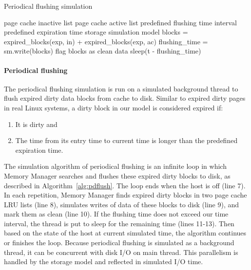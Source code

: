 \documentclass[conference]{IEEEtran}
\newcommand{\Desc}[2]{\State \makebox[2em][l]{#1}#2}
\begin{document}
			\begin{algorithm}\caption{Periodical flushing simulation}\label{alg:pdflush}
				\small
				\begin{algorithmic}[1]
					\Input
        				\Desc{in}{page cache inactive list}
        				\Desc{ac}{page cache active list}
						\Desc{t}{predefined flushing time interval}
						\Desc{exp}{predefined expiration time}						
						\Desc{sm}{storage simulation model}
   					\EndInput
						\State blocks = expired\_blocks(exp, in) + expired\_blocks(exp, ac) 
						\State flushing\_time = sm.write(blocks)
						\State flag blocks as clean data
							\State sleep(t - flushing\_time)
						\EndIf
					\EndWhile
				\end{algorithmic}
			\end{algorithm}				

			\paragraph*{Periodical flushing}	
			The periodical flushing simulation is run on a simulated background thread 
			to flush expired dirty data blocks from cache to disk.
			Similar to expired dirty pages in real Linux systems, a dirty block in our model 
			is considered expired if: 
			\begin{enumerate}
				\item It is dirty and 
				\item The time from its entry time to current time is longer than the 
				predefined expiration time. 
			\end{enumerate}
			The simulation algorithm of periodical flushing is an infinite loop in which 
			Memory Manager searches and flushes these expired dirty blocks to disk, 
			as described in Algorithm~\ref{alg:pdflush}. 
			The loop ends when the host is off (line 7). 
			In each repetition, Memory Manager finds expired dirty blocks in two 
			page cache LRU lists (line 8), simulates writes of data of these blocks 
			to disk (line 9), and mark them as clean (line 10).
			If the flushing time does not exceed our time interval, the thread is put 
			to sleep for the remaining time (lines 11-13). 
			Then based on the state of the host at current simulated time, 
			the algorithm continues or finishes the loop.
			Because periodical flushing is simulated as a background thread, it can be 
			concurrent with disk I/O on main thread. This parallelism is handled by the 
			storage model and reflected in simulated I/O time.
\end{document}
